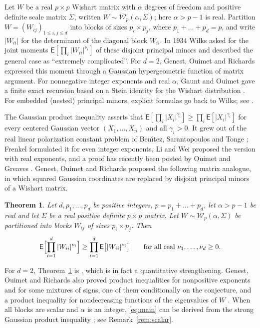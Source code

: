 \documentclass{amsart}
\newtheorem{theorem}{Theorem}[section]
\theoremstyle{definition}
\theoremstyle{remark}
\numberwithin{equation}{section}
\newcommand{\E}{\mathsf{E}}
\newcommand{\W}{\mathcal{W}}
\begin{document}
Let $W$ be a real $p\times p$ Wishart matrix with $\alpha$ degrees of freedom and positive definite scale matrix $\Sigma$, written $W\sim\W_p(\alpha,\Sigma)$; here $\alpha>p-1$ is real. Partition $W=(W_{ij})_{1\le i,j\le d}$ into blocks of sizes $p_i\times p_j$, where $p_1+\dots+p_d=p$, and write $|W_{ii}|$ for the determinant of the diagonal block $W_{ii}$. In 1934 Wilks \cite{Wil34} asked for the joint moments $\E[\prod_i|W_{ii}|^{\nu_i}]$ of these disjoint principal minors and described the general case as ``extremely complicated''. For $d=2$, Genest, Ouimet and Richards \cite{GOR25} expressed this moment through a Gaussian hypergeometric function of matrix argument. For nonnegative integer exponents and real $\alpha$, Gaunt and Ouimet \cite{GO26} gave a finite exact recursion based on a Stein identity for the Wishart distribution \cite{BGORS26}. For embedded (nested) principal minors, explicit formulas go back to Wilks; see \cite{GOR24b}.

The Gaussian product inequality asserts that $\E[\prod_i|X_i|^{\gamma_i}]\ge\prod_i\E[|X_i|^{\gamma_i}]$ for every centered Gaussian vector $(X_1,\dots,X_n)$ and all $\gamma_i>0$. It grew out of the real linear polarization constant problem of Ben\'{\i}tez, Sarantopoulos and Tonge \cite{BST98}; Frenkel \cite{Fre08} formulated it for even integer exponents, Li and Wei \cite{LW12} proposed the version with real exponents, and a proof has recently been posted by Ouimet and Greaves \cite{OG26}. Genest, Ouimet and Richards \cite[Conjecture~1.1]{GOR24a} proposed the following matrix analogue, in which squared Gaussian coordinates are replaced by disjoint principal minors of a Wishart matrix.

\begin{theorem}\label{thm:main}
Let $d,p_1,\dots,p_d$ be positive integers, $p=p_1+\dots+p_d$, let $\alpha>p-1$ be real and let $\Sigma$ be a real positive definite $p\times p$ matrix. Let $W\sim\W_p(\alpha,\Sigma)$ be partitioned into blocks $W_{ij}$ of sizes $p_i\times p_j$. Then
\begin{equation}\label{eq:main}
\E\Bigl[\prod_{i=1}^d|W_{ii}|^{\nu_i}\Bigr]\ge\prod_{i=1}^d\E\bigl[|W_{ii}|^{\nu_i}\bigr]
\qquad\text{for all real }\nu_1,\dots,\nu_d\ge0.
\end{equation}
\end{theorem}

For $d=2$, Theorem~\ref{thm:main} is \cite[Corollary~3.4]{GOR25}, which is in fact a quantitative strengthening. Genest, Ouimet and Richards \cite{GOR24a} also proved product inequalities for nonpositive exponents and for some mixtures of signs, one of them conditionally on the conjecture, and a product inequality for nondecreasing functions of the eigenvalues of $W$ \cite[Theorem~3.14]{GOR24a}. When all blocks are scalar and $\alpha$ is an integer, \eqref{eq:main} can be derived from the strong Gaussian product inequality \cite[Theorem~1]{OG26}; see Remark~\ref{rem:scalar}.
\end{document}

